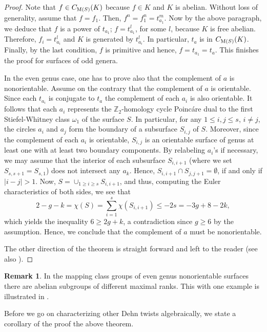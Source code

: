 \documentclass[11 pt]{amsart}
\theoremstyle{definition}
\newtheorem{Remark}[Theorem]{Remark}
\begin{document}
\begin{proof}
Note that $f \in C_{{\rm M}(S)}(K)$ because $f \in K$ and $K$ is
abelian. Without loss of generality, assume that $f=f_{1}$. Then,
$f^{n} = f_{1}^{n} = t_{a_{1}}^{m}$. Now by the above paragraph, we
deduce that $f$ is a power of $t_{a_{1}}$; $f=t_{a_{1}}^{l}$, for
some $l$, because $K$ is free abelian. Therefore,
$f_{i}=t_{a_i}^{l}$ and $K$ is generated by $t_{a_{i}}^{l}$. In
particular, $t_{a}$ is in $C_{{\rm M}(S)}(K)$. Finally, by the last
condition, $f$ is primitive and hence, $f = t_{a_1}=t_a$. This
finishes the proof for surfaces of odd genera.

In the even genus case, one has to prove also that the complement of
$a$ is nonorientable.  Assume on the contrary that the complement of
$a$ is orientable. Since each $t_{a_i}$ is conjugate to $t_a$ the
complement of each $a_i$ is also orientable. It follows that each
$a_i$ represents the ${\mathbb Z}_2$-homology cycle Poinc\'are dual
to the first Stiefel-Whitney class $\omega_1$ of the surface $S$. In
particular, for any $1\leq i,j \leq s$, $i\neq j$, the circles $a_i$
and $a_j$ form the boundary of a subsurface $S_{i,j}$ of $S$.
Moreover, since the complement of each $a_i$ is orientable,
$S_{i,j}$ is an orientable surface of genus at least one with at
least two boundary components. By relabeling $a_i$'s if necessary,
we may assume that the interior of each subsurface $S_{i,i+1}$
(where we set $S_{s,s+1}=S_{s,1}$) does not intersect any $a_k$.
Hence, $S_{i,i+1}\cap S_{j,j+1}=\emptyset$, if and only if
$|i-j|>1$.  Now, $S=\cup_{1\geq i \geq s}S_{i,i+1}$, and thus,
computing the Euler characteristics of both sides, we see that
$$2-g-k=\chi(S)=\sum_{i=1}^s \chi(S_{i,i+1})\leq -2s=-3g+8-2k ,$$
which yields the inequality $6\geq 2g+k $, a contradiction since
$g\geq 6$ by the assumption. Hence, we conclude that the complement of $a$ must be
nonorientable.

The other direction of the theorem is straight forward and left to
the reader (see also \cite{I1}).
\end{proof}

\begin{Remark}\label{EvenGenusMaxCurv} In the mapping class groups of
even genus nonorientable surfaces there are  abelian subgroups of
different maximal ranks. This with one example is illustrated in
\cite{ASzep}.
\end{Remark}

Before we go on characterizing other Dehn twists algebraically, we
state a corollary of the proof the above theorem.
\end{document}
